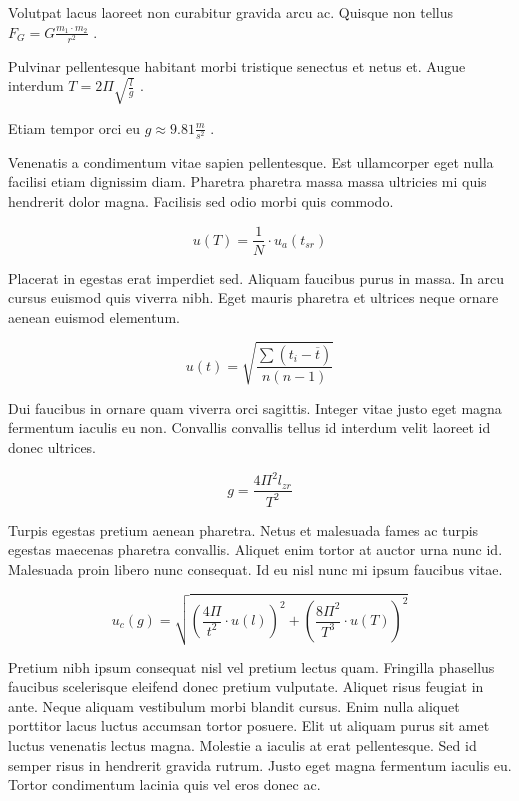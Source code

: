 \documentclass{article}
\begin{document}
Volutpat lacus laoreet non curabitur gravida arcu ac. Quisque non tellus 
\begin{math}
	F_{G}=G\frac{m_1\cdot m_2}{r^2}
\end{math}
.\newline

Pulvinar pellentesque habitant morbi tristique senectus et netus et. Augue interdum 
$ T=2\Pi \sqrt{\frac{l}{g}} $
.\newline

Etiam tempor orci eu 
\( g\approx 9.81\frac{m}{s^2} \)
.\newline

Venenatis a condimentum vitae sapien pellentesque. Est ullamcorper eget nulla facilisi etiam dignissim diam. Pharetra pharetra massa massa ultricies mi quis hendrerit dolor magna. Facilisis sed odio morbi quis commodo.

\[ u(T)=\frac{1}{N} \cdot u_a (t_{sr}) \]

Placerat in egestas erat imperdiet sed. Aliquam faucibus purus in massa. In arcu cursus euismod quis viverra nibh. Eget mauris pharetra et ultrices neque ornare aenean euismod elementum.

$$ u(t)=\sqrt{\frac{\sum(t_i-\overline{t})}{n(n-1)}} $$

Dui faucibus in ornare quam viverra orci sagittis. Integer vitae justo eget magna fermentum iaculis eu non. Convallis convallis tellus id interdum velit laoreet id donec ultrices. 

\begin{displaymath}
	g=\frac{4\Pi^2l_{zr}}{T^2}
\end{displaymath}

Turpis egestas pretium aenean pharetra. Netus et malesuada fames ac turpis egestas maecenas pharetra convallis. Aliquet enim tortor at auctor urna nunc id. Malesuada proin libero nunc consequat. Id eu nisl nunc mi ipsum faucibus vitae.

\begin{equation}
	u_c(g)=\sqrt{(\frac{4\Pi}{t^2}\cdot u(l))^2+(\frac{8\Pi^2}{T^3}\cdot u(T))^2}
\end{equation}

Pretium nibh ipsum consequat nisl vel pretium lectus quam. Fringilla phasellus faucibus scelerisque eleifend donec pretium vulputate. Aliquet risus feugiat in ante. Neque aliquam vestibulum morbi blandit cursus. Enim nulla aliquet porttitor lacus luctus accumsan tortor posuere. Elit ut aliquam purus sit amet luctus venenatis lectus magna. Molestie a iaculis at erat pellentesque. Sed id semper risus in hendrerit gravida rutrum. Justo eget magna fermentum iaculis eu. Tortor condimentum lacinia quis vel eros donec ac.
\end{document}
